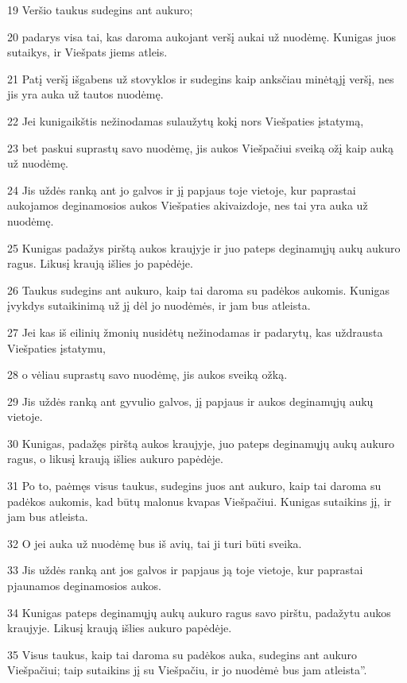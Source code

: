 \par 19 Veršio taukus sudegins ant aukuro; 
\par 20 padarys visa tai, kas daroma aukojant veršį aukai už nuodėmę. Kunigas juos sutaikys, ir Viešpats jiems atleis. 
\par 21 Patį veršį išgabens už stovyklos ir sudegins kaip anksčiau minėtąjį veršį, nes jis yra auka už tautos nuodėmę. 
\par 22 Jei kunigaikštis nežinodamas sulaužytų kokį nors Viešpaties įstatymą, 
\par 23 bet paskui suprastų savo nuodėmę, jis aukos Viešpačiui sveiką ožį kaip auką už nuodėmę. 
\par 24 Jis uždės ranką ant jo galvos ir jį papjaus toje vietoje, kur paprastai aukojamos deginamosios aukos Viešpaties akivaizdoje, nes tai yra auka už nuodėmę. 
\par 25 Kunigas padažys pirštą aukos kraujyje ir juo pateps deginamųjų aukų aukuro ragus. Likusį kraują išlies jo papėdėje. 
\par 26 Taukus sudegins ant aukuro, kaip tai daroma su padėkos aukomis. Kunigas įvykdys sutaikinimą už jį dėl jo nuodėmės, ir jam bus atleista. 
\par 27 Jei kas iš eilinių žmonių nusidėtų nežinodamas ir padarytų, kas uždrausta Viešpaties įstatymu, 
\par 28 o vėliau suprastų savo nuodėmę, jis aukos sveiką ožką. 
\par 29 Jis uždės ranką ant gyvulio galvos, jį papjaus ir aukos deginamųjų aukų vietoje. 
\par 30 Kunigas, padažęs pirštą aukos kraujyje, juo pateps deginamųjų aukų aukuro ragus, o likusį kraują išlies aukuro papėdėje. 
\par 31 Po to, paėmęs visus taukus, sudegins juos ant aukuro, kaip tai daroma su padėkos aukomis, kad būtų malonus kvapas Viešpačiui. Kunigas sutaikins jį, ir jam bus atleista. 
\par 32 O jei auka už nuodėmę bus iš avių, tai ji turi būti sveika. 
\par 33 Jis uždės ranką ant jos galvos ir papjaus ją toje vietoje, kur paprastai pjaunamos deginamosios aukos. 
\par 34 Kunigas pateps deginamųjų aukų aukuro ragus savo pirštu, padažytu aukos kraujyje. Likusį kraują išlies aukuro papėdėje. 
\par 35 Visus taukus, kaip tai daroma su padėkos auka, sudegins ant aukuro Viešpačiui; taip sutaikins jį su Viešpačiu, ir jo nuodėmė bus jam atleista”.



